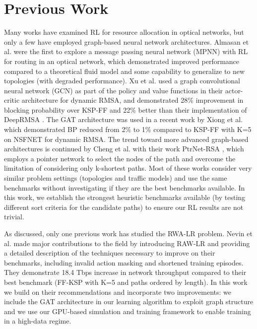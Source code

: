 \section{Previous Work}
Many works have examined RL for resource allocation in optical networks, but only a few have employed graph-based neural network architectures. Almasan et al. \cite{almasan_deep_2022} were the first to explore a message passing neural network (MPNN) with RL for routing in an optical network, which demonstrated improved performance compared to a theoretical fluid model and some capability to generalize to new topologies (with degraded performance). Xu et al. \cite{xu_deep_2022} used a graph convolutional neural network (GCN) as part of the policy and value functions in their actor-critic architecture for dynamic RMSA, and demonstrated 28\% improvement in blocking probability over KSP-FF and 22\% better than their implementation of DeepRMSA \cite{chen_deeprmsa_2019}. The GAT architecture was used in a recent work by Xiong et al. \cite{xiong_graph_2024} which demonstrated BP reduced from 2\% to 1\% compared to KSP-FF with K=5 on NSFNET for dynamic RMSA. The trend toward more advanced graph-based architectures is continued by Cheng et al. with their work PtrNet-RSA \cite{cheng_ptrnet-rsa_2024}, which employs a pointer network \cite{vinyals_pointer_2015} to select the nodes of the path and overcome the limitation of considering only k-shortest paths. Most of these works consider very similar problem settings (topologies and traffic models) and use the same benchmarks without investigating if they are the best benchmarks available. In this work, we establish the strongest heuristic benchmarks available (by testing different sort criteria for the candidate paths) to ensure our RL results are not trivial.

As discussed, only one previous work has studied the RWA-LR problem. Nevin et al. \cite{nevin_techniques_2022} made major contributions to the field by introducing RAW-LR and providing a detailed description of the techniques necessary to improve on their benchmarks, including invalid action masking and shortened training episodes. They demonstrate 18.4 Tbps increase in network throughput compared to their best benchmark (FF-KSP with K=5 and paths ordered by length). In this work we build on their recommendations and incorporate two improvements: we include the GAT architecture in our learning algorithm to exploit graph structure and we use our GPU-based simulation and training framework to enable training in a high-data regime.


